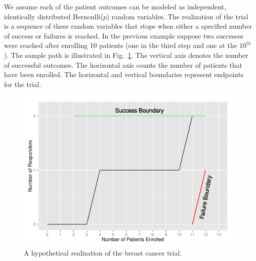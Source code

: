 \documentclass[12pt]{article}         %
\begin{document}
We assume each of the patient outcomes can be modeled as independent, 
identically distributed Bernoulli($p$) random variables. The realization of 
the trial is a sequence of these random variables that stops when either a 
specified number of success or failures is reached. In the 
previous example suppose two successes were reached after enrolling 10 
patients (one in the third step and one at the $10^{th}$). The sample
path is illustrated 
in Fig.~\ref{fig:kane_viz}. The vertical axis denotes the number of 
successful outcomes. The horizontal axis counts the number of patients that 
have been enrolled. The horizontal and vertical boundaries represent 
endpoints for the trial. 

\begin{figure}[ht]
\includegraphics[width=\textwidth]{KanePlot.pdf}
\caption{
A hypothetical realization of the breast cancer trial.
}
\label{fig:kane_viz}
\end{figure}

\end{document}

